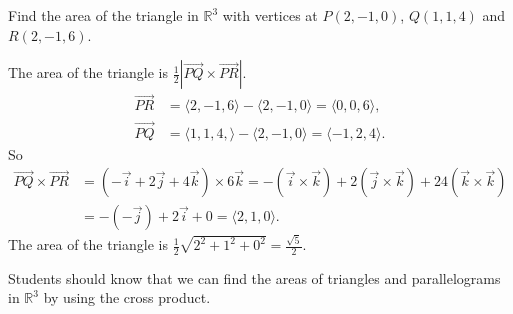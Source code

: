 \documentclass[handout,instructornotes]{ximera}
\begin{document}
\begin{problem}
Find the area of the triangle in $\mathbb{R}^3$ with vertices at $P(2, -1, 0)$, $Q(1, 1, 4)$ and $R(2, -1, 6)$. 
	\begin{freeResponse}
	The area of the triangle is $\frac{1}{2} | \vec{PQ} \times \vec{PR}|$. 
	\begin{align*}
	\vec{PR} &= \langle 2, -1, 6 \rangle - \langle 2, -1, 0 \rangle = \langle 0, 0, 6 \rangle, \\
	\vec{PQ} &= \langle 1, 1, 4, \rangle - \langle 2, -1, 0 \rangle = \langle -1, 2, 4 \rangle.
	\end{align*}
	So 
	\begin{align*}
	\vec{PQ} \times \vec{PR} &= (-\vec{i} +2\vec{j} +4\vec{k})\times 6\vec{k} = - (\vec{i}\times \vec{k}) +2 (\vec{j} \times \vec{k}) +24 (\vec{k}\times \vec{k}) \\ &= - (-\vec{j}) + 2 \vec{i} + 0 = \langle 2, 1, 0 \rangle.
	\end{align*}
	The area of the triangle is $\frac{1}{2} \sqrt{2^2+1^2+0^2} = \frac{\sqrt{5}}{2}$. 
	\end{freeResponse}
		
\end{problem}

\begin{instructorNotes}
Students should know that we can find the areas of triangles and parallelograms in $\mathbb{R}^3$ by using the cross product.
\end{instructorNotes}
\end{document}
